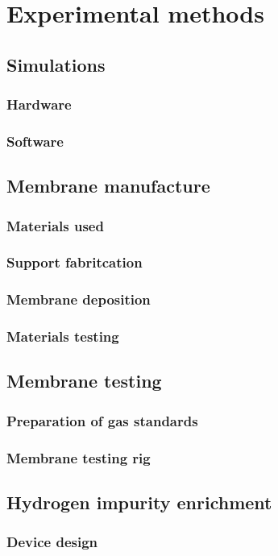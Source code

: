 \chapter{Experimental methods}

\section{Simulations}
\subsection{Hardware}
\subsection{Software}

\section{Membrane manufacture}

\subsection{Materials used}
\subsection{Support fabritcation}
\subsection{Membrane deposition}
\subsection{Materials testing}

\section{Membrane testing}
\subsection{Preparation of gas standards}
\subsection{Membrane testing rig}

\section{Hydrogen impurity enrichment}
\subsection{Device design}

\renewcommand{\bibname}{References}

